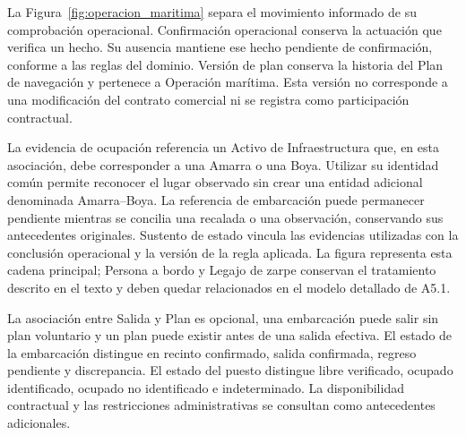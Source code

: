 La Figura~\ref{fig:operacion_maritima} separa el movimiento informado de su comprobación operacional. Confirmación operacional conserva la actuación que verifica un hecho. Su ausencia mantiene ese hecho pendiente de confirmación, conforme a las reglas del dominio. Versión de plan conserva la historia del Plan de navegación y pertenece a Operación marítima. Esta versión no corresponde a una modificación del contrato comercial ni se registra como participación contractual.

La evidencia de ocupación referencia un Activo de Infraestructura que, en esta asociación, debe corresponder a una Amarra o una Boya. Utilizar su identidad común permite reconocer el lugar observado sin crear una entidad adicional denominada Amarra--Boya. La referencia de embarcación puede permanecer pendiente mientras se concilia una recalada o una observación, conservando sus antecedentes originales. Sustento de estado vincula las evidencias utilizadas con la conclusión operacional y la versión de la regla aplicada. La figura representa esta cadena principal; Persona a bordo y Legajo de zarpe conservan el tratamiento descrito en el texto y deben quedar relacionados en el modelo detallado de A5.1.

La asociación entre Salida y Plan es opcional, una embarcación puede salir sin plan voluntario y un plan puede existir antes de una salida efectiva. El estado de la embarcación distingue en recinto confirmado, salida confirmada, regreso pendiente y discrepancia. El estado del puesto distingue libre verificado, ocupado identificado, ocupado no identificado e indeterminado. La disponibilidad contractual y las restricciones administrativas se consultan como antecedentes adicionales.

